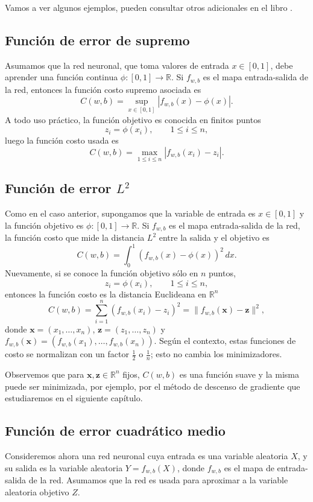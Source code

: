 \documentclass[12pt, a4paper]{amsbook}
\newcommand{\R}{{\mathbb R}}
\newcommand{\xx}{{\mathbf x}}
\newcommand{\zz}{{\mathbf z}}
\theoremstyle{remark}
\theoremstyle{definition}
\numberwithin{section}{chapter}
\numberwithin{subsection}{section}
\numberwithin{equation}{section}
\numberwithin{figure}{chapter}
\begin{document}
Vamos a ver algunos ejemplos, pueden consultar otros adicionales en el libro \cite{Calin}.
 
\subsection{Función de error de supremo}
Asumamos que la red neuronal, que toma valores de entrada $x\in [0,1]$, debe aprender una función continua $\phi\colon [0,1]\to \R$. Si $f_{w, b}$ es el mapa entrada-salida de la red, entonces la función costo supremo asociada es
$$
C(w, b) = \sup_{x\in [0,1]} |f_{w, b}(x) - \phi(x)|.
$$
A todo uso práctico, la función objetivo es conocida en finitos puntos
$$
z_i = \phi(x_i),\qquad 1\le i\le n,
$$
luego la función costo usada es
$$
C(w, b) = \max_{1\le i\le n}  |f_{w, b}(x_i) - z_i|.
$$

\subsection{Función de error $L^2$}\label{L2}
Como en el caso anterior, supongamos que la variable de entrada es $x\in [0,1]$ y la función objetivo es $\phi\colon [0,1]\to \R$. Si $f_{w, b}$ es el mapa entrada-salida de la red, la función costo que mide la distancia $L^2$ entre la salida y el objetivo es
$$
C(w, b) = \int_0^1 (f_{w, b}(x) - \phi(x))^2\, dx.
$$
Nuevamente, si se conoce la función objetivo sólo en $n$ puntos,
$$
z_i = \phi(x_i),\qquad 1\le i\le n,
$$
entonces la función costo es la distancia Euclideana en $\R^n$
 $$
 C(w, b) = \sum_{i=1}^n (f_{w, b}(x_i) - z_i)^2 = \| f_{w, b}(\xx) - \zz\|^2,
 $$
 donde $\xx=(x_1,\dots,x_n)$, $\zz = (z_1,\dots,z_n)$ y $f_{w, b}(\xx) = (f_{w, b}(x_1),\dots,f_{w, b}(x_n))$. Según el contexto, estas funciones de costo se normalizan con un factor $\frac12$ o $\frac1n$; esto no cambia los minimizadores.

Observemos que para $\xx, \zz\in \R^n$ fijos, $C(w, b)$ es una función suave y la misma puede ser minimizada, por ejemplo, por el método de descenso de gradiente que estudiaremos en el siguiente capítulo.

\subsection{Función de error cuadrático medio}
Consideremos ahora una red neuronal cuya entrada es una variable aleatoria $X$, y su salida es la variable aleatoria $Y=f_{w, b}(X)$, donde $f_{w, b}$ es el mapa de entrada-salida de la red. Asumamos que la red es usada para aproximar a la variable aleatoria objetivo $Z$. 
\end{document}
